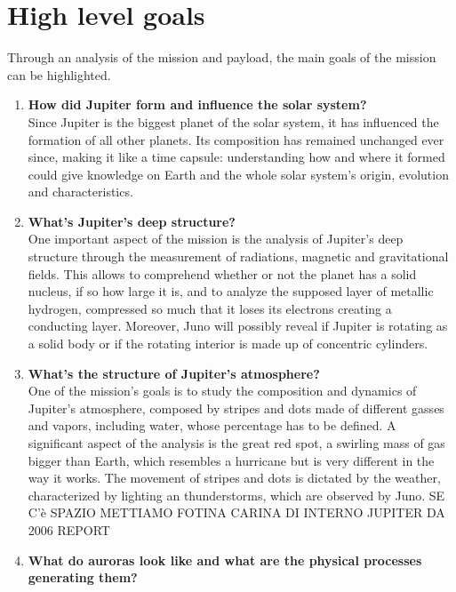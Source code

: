 \section{High level goals}
\label{sec:goals}

Through an analysis of the mission and payload, the main goals of the mission can be highlighted. 

\begin{enumerate}
    \item \textbf{How did Jupiter form and influence the solar system? }\\ %
    Since Jupiter is the biggest planet of the solar system, it has influenced the formation of all other planets. Its composition has remained unchanged ever since, making it like a time capsule: understanding how and where it formed could give knowledge on Earth and the whole solar system’s origin, evolution and characteristics. 
    \item \textbf{What's Jupiter's deep structure?}\\
    One important aspect of the mission is the analysis of Jupiter's deep structure through the measurement of radiations, magnetic and gravitational fields. This allows to comprehend whether or not the planet has a solid nucleus, if so how large it is, and to analyze the supposed layer of metallic hydrogen, compressed so much that it loses its electrons creating a conducting layer.  Moreover, Juno will possibly reveal if Jupiter is rotating as a solid body or if the rotating interior is made up of concentric cylinders. %
    \item \textbf{What's the structure of Jupiter's atmosphere?}\\ %
    One of the mission's goals is to study the composition and dynamics of Jupiter's atmosphere, composed by stripes and dots made of different gasses and vapors, including water, whose percentage has to be defined. A significant aspect of the analysis is the great red spot, a swirling mass of gas bigger than Earth, which resembles a hurricane but is very different in the way it works. The movement of stripes and dots is dictated by the weather, characterized by lighting an thunderstorms, which are observed by Juno. SE C'è SPAZIO METTIAMO FOTINA CARINA DI INTERNO JUPITER DA 2006 REPORT
    \item \textbf{What do auroras look like and what are the physical processes generating them?}\\ %

\end{enumerate}
